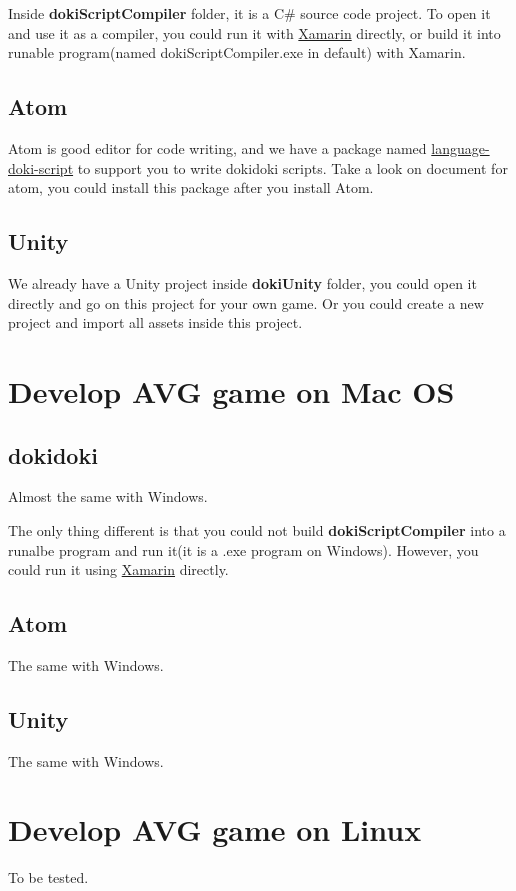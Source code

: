 Inside \textbf{dokiScriptCompiler} folder, it is a C\# source code project. To open it and use it as a compiler, you could run it with \href{https://www.xamarin.com/}{Xamarin} directly, or build it into runable program(named dokiScriptCompiler.exe in default) with Xamarin.

\subsection{Atom}

Atom is good editor for code writing, and we have a package named \href{https://github.com/kesumu/language-doki-script}{language-doki-script} to support you to write dokidoki scripts. Take a look on document for atom, you could install this package after you install Atom.

\subsection{Unity}

We already have a Unity project inside \textbf{dokiUnity} folder, you could open it directly and go on this project for your own game. Or you could create a new project and import all assets inside this project.

\section{Develop AVG game on Mac OS}

\subsection{dokidoki}

Almost the same with Windows. 

The only thing different is that you could not build \textbf{dokiScriptCompiler} into a runalbe program and run it(it is a .exe program on Windows). However, you could run it using \href{https://www.xamarin.com/}{Xamarin} directly.

\subsection{Atom}

The same with Windows. 

\subsection{Unity}

The same with Windows. 

\section{Develop AVG game on Linux}

To be tested.